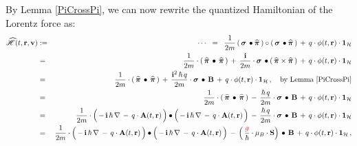 \vskip 0.5cm
\noindent
By Lemma \ref{PiCrossPi}, we can now rewrite
the quantized Hamiltonian of the Lorentz force as:
\begin{eqnarray*}
\widehat{\mathscr{H}}(t, \mathbf{r}, \mathbf{v})
& := &
    \cdots
\;\; = \;\;
    \dfrac{1}{2m}
    \left(\,
        \boldsymbol{\sigma}\,\bullet\boldsymbol{\widehat{\pi}}
        \,\right)
    \circ
    \left(\,
        \boldsymbol{\sigma}\,\bullet\boldsymbol{\widehat{\pi}}
        \,\right)
    \, + \,
    q\cdot\phi(t,\mathbf{r})\cdot\boldsymbol{1}_{\mathcal{H}}
\\
& = &
    \dfrac{1}{2m}\cdot
    \left(\,\boldsymbol{\widehat{\pi}}\,\bullet\,\boldsymbol{\widehat{\pi}}\,\right)
    \, + \,
    \dfrac{\i}{2m}
    \cdot\boldsymbol{\sigma} \,\bullet \left(\,
        \boldsymbol{\widehat{\pi}}
        \times
        \boldsymbol{\widehat{\pi}}
        \,\right)
    \, + \,
    q\cdot\phi(t,\mathbf{r})\cdot\boldsymbol{1}_{\mathcal{H}}
\\
& = &
    \dfrac{1}{2m}\cdot
    \left(\,\boldsymbol{\widehat{\pi}}\,\bullet\,\boldsymbol{\widehat{\pi}}\,\right)
    \, + \,
    \dfrac{\i^{2}\,\hbar\,q}{2m}
    \cdot\boldsymbol{\sigma} \,\bullet\, \mathbf{B}
    \, + \,
    q\cdot\phi(t,\mathbf{r})\cdot\boldsymbol{1}_{\mathcal{H}}\,,
    \quad
    \textnormal{by Lemma \ref{PiCrossPi}}
\\
& = &
    \dfrac{1}{2m}\cdot
    \left(\,\boldsymbol{\widehat{\pi}}\,\bullet\,\boldsymbol{\widehat{\pi}}\,\right)
    \, - \,
    \dfrac{\hbar\,q}{2m}
    \cdot\boldsymbol{\sigma} \,\bullet\, \mathbf{B}
    \, + \,
    q\cdot\phi(t,\mathbf{r})\cdot\boldsymbol{1}_{\mathcal{H}}
\\
& = &
    \dfrac{1}{2m}\cdot
    \left(\,
        -\,\i\,\hbar\,\nabla
        \, \overset{{\color{white}.}}{-} \,
        q\cdot\mathbf{A}(t,\mathbf{r})
        \,\right)
    \bullet
    \left(\,
        -\,\i\,\hbar\,\nabla
        \, \overset{{\color{white}.}}{-} \,
        q\cdot\mathbf{A}(t,\mathbf{r})
        \,\right)
    \, - \,
    \dfrac{\hbar\,q}{2m}
    \cdot\boldsymbol{\sigma} \,\bullet\, \mathbf{B}
    \, + \,
    q\cdot\phi(t,\mathbf{r})\cdot\boldsymbol{1}_{\mathcal{H}}
\\
& = &
    \dfrac{1}{2m}\cdot
    \left(\,
        -\,\i\,\hbar\,\nabla
        \, \overset{{\color{white}.}}{-} \,
        q\cdot\mathbf{A}(t,\mathbf{r})
        \,\right)
    \bullet
    \left(\,
        -\,\i\,\hbar\,\nabla
        \, \overset{{\color{white}.}}{-} \,
        q\cdot\mathbf{A}(t,\mathbf{r})
        \,\right)
    \, - \,
    \left(\,
        \dfrac{{\color{red}g}}{\hbar}
        \cdot
        \mu_{B}
        \cdot
        \mathbf{S}
        \right)
    \,\bullet\, \mathbf{B}
    \, + \,
    q\cdot\phi(t,\mathbf{r})\cdot\boldsymbol{1}_{\mathcal{H}}\,,
\end{eqnarray*}
